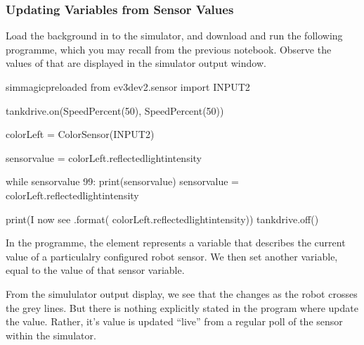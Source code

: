 \documentclass[letterpaper,10pt,english]{sphinxmanual}
\begin{document}
\subsubsection{Updating Variables from Sensor Values}
\label{\detokenize{content/01_Robot_Lab/Section_00_02:Updating-Variables-from-Sensor-Values}}
Load the  background in to the simulator, and download and run the following programme, which you may recall from the previous notebook. Observe the values of that are displayed in the simulator output window.

{
\begin{sphinxVerbatim}[commandchars=\\\{\}]
\llap{\color{nbsphinxin}[ ]:\,\hspace{\fboxrule}\hspace{\fboxsep}}\PYGZpc{}\PYGZpc{}sim\PYGZus{}magic\PYGZus{}preloaded
from ev3dev2.sensor import INPUT\PYGZus{}2

tank\PYGZus{}drive.on(SpeedPercent(50), SpeedPercent(50))

colorLeft = ColorSensor(INPUT\PYGZus{}2)

sensor\PYGZus{}value = colorLeft.reflected\PYGZus{}light\PYGZus{}intensity

while sensor\PYGZus{}value \PYGZgt{} 99:
    print(sensor\PYGZus{}value)
    sensor\PYGZus{}value = colorLeft.reflected\PYGZus{}light\PYGZus{}intensity

print(\PYGZdq{}I now see \PYGZob{}\PYGZcb{}\PYGZdq{}.format( colorLeft.reflected\PYGZus{}light\PYGZus{}intensity))
tank\PYGZus{}drive.off()
\end{sphinxVerbatim}
}

In the programme, the  element represents a variable that describes the current value of a particulalry configured robot sensor. We then set another variable, equal to the value of that sensor variable.

From the simululator output display, we see that the  changes as the robot crosses the grey lines. But there is nothing explicitly stated in the program where  update the  value. Rather, it’s value is updated “live” from a regular poll of the sensor within the simulator.
\end{document}
